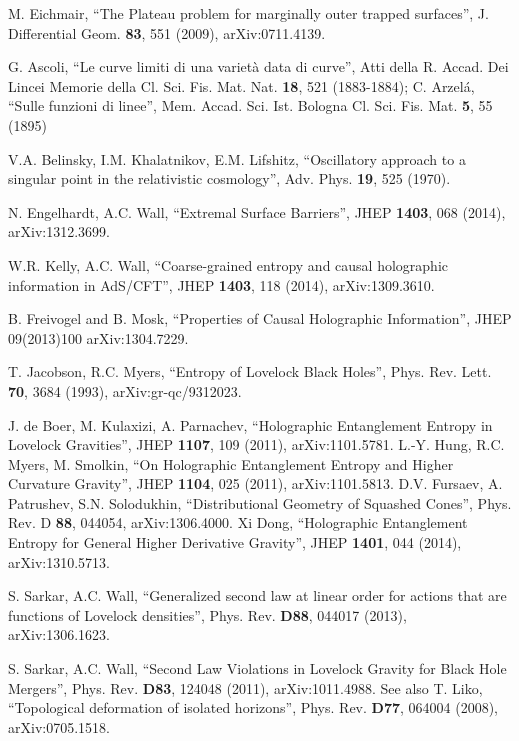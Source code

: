 \documentclass[12pt]{article}
\begin{document}
\begin{thebibliography}{99}
M. Eichmair, ``The Plateau problem for marginally outer trapped surfaces'', J. Differential Geom. \textbf{83}, 551 (2009), arXiv:0711.4139.


G. Ascoli, ``Le curve limiti di una variet\`{a} data di curve'', Atti della R. Accad. Dei Lincei Memorie della Cl. Sci. Fis. Mat. Nat. \textbf{18}, 521 (1883-1884); C. Arzel\'{a}, ``Sulle funzioni di linee'', Mem. Accad. Sci. Ist. Bologna Cl. Sci. Fis. Mat. \textbf{5}, 55 (1895)

V.A. Belinsky, I.M. Khalatnikov, E.M. Lifshitz, ``Oscillatory approach to a singular point in the relativistic cosmology'', Adv. Phys. \textbf{19}, 525 (1970).

N. Engelhardt, A.C. Wall, ``Extremal Surface Barriers'', JHEP \textbf{1403}, 068 (2014), arXiv:1312.3699.

W.R. Kelly, A.C. Wall, ``Coarse-grained entropy and causal holographic information in AdS/CFT'', JHEP \textbf{1403}, 118 (2014), arXiv:1309.3610.

B. Freivogel and B. Mosk, ``Properties of Causal Holographic Information'', JHEP 09(2013)100 arXiv:1304.7229.

T. Jacobson, R.C. Myers, ``Entropy of Lovelock Black Holes'', Phys. Rev. Lett.  \textbf{70}, 3684 (1993), arXiv:gr-qc/9312023.

J. de Boer, M. Kulaxizi, A. Parnachev, ``Holographic Entanglement Entropy in Lovelock Gravities'', JHEP \textbf{1107}, 109 (2011), arXiv:1101.5781.
L.-Y. Hung, R.C. Myers, M. Smolkin, ``On Holographic Entanglement Entropy and Higher Curvature Gravity'', JHEP \textbf{1104}, 025 (2011), arXiv:1101.5813.
D.V. Fursaev, A. Patrushev, S.N. Solodukhin, ``Distributional Geometry of Squashed Cones'', Phys. Rev. D \textbf{88}, 044054, arXiv:1306.4000.
Xi Dong, ``Holographic Entanglement Entropy for General Higher Derivative Gravity'', JHEP \textbf{1401}, 044 (2014), arXiv:1310.5713.

S. Sarkar, A.C. Wall, ``Generalized second law at linear order for actions that are functions of Lovelock densities'', Phys. Rev. \textbf{D88}, 044017 (2013), arXiv:1306.1623.

S. Sarkar, A.C. Wall, ``Second Law Violations in Lovelock Gravity for Black Hole Mergers'', Phys. Rev. \textbf{D83}, 124048 (2011), arXiv:1011.4988.  See also T. Liko, ``Topological deformation of isolated horizons'', Phys. Rev. \textbf{D77}, 064004 (2008), arXiv:0705.1518.


\end{thebibliography}
\end{document}
